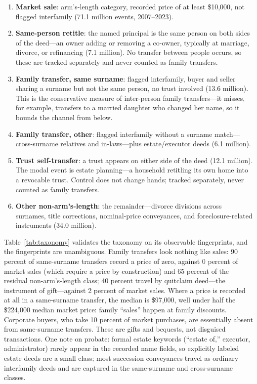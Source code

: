\documentclass[12pt, letterpaper]{article}
\begin{document}
\begin{enumerate}
  \item \textbf{Market sale}: arm's-length category, recorded price of at
        least \$10,000, not flagged interfamily (71.1 million events,
        2007--2023).
  \item \textbf{Same-person retitle}: the named principal is the same person
        on both sides of the deed---an owner adding or removing a co-owner,
        typically at marriage, divorce, or refinancing (7.1 million). No
        transfer between people occurs, so these are tracked separately and
        never counted as family transfers.
  \item \textbf{Family transfer, same surname}: flagged interfamily, buyer
        and seller sharing a surname but not the same person, no trust
        involved (13.6 million). This is the conservative measure of
        inter-person family transfers---it misses, for example, transfers to
        a married daughter who changed her name, so it bounds the channel
        from below.
  \item \textbf{Family transfer, other}: flagged interfamily without a
        surname match---cross-surname relatives and in-laws---plus
        estate/executor deeds (6.1 million).
  \item \textbf{Trust self-transfer}: a trust appears on either side of the
        deed (12.1 million). The modal event is estate planning---a household
        retitling its own home into a revocable trust. Control does not
        change hands; tracked separately, never counted as family transfers.
  \item \textbf{Other non-arm's-length}: the remainder---divorce divisions
        across surnames, title corrections, nominal-price conveyances, and
        foreclosure-related instruments (34.0 million).
\end{enumerate}

Table~\ref{tab:taxonomy} validates the taxonomy on its observable
fingerprints, and the fingerprints are unambiguous. Family transfers look
nothing like sales: 90 percent of same-surname transfers record a price of
zero, against 0 percent of market sales (which require a price by
construction) and 65 percent of the residual non-arm's-length class; 40
percent travel by quitclaim deed---the instrument of gift---against 2 percent
of market sales. Where a price is recorded at all in a same-surname transfer,
the median is \$97,000, well under half the \$224,000 median market price:
family ``sales'' happen at family discounts. Corporate buyers, who take 10
percent of market purchases, are essentially absent from same-surname
transfers. These are gifts and bequests, not disguised transactions. One
note on probate: formal estate keywords (``estate of,'' executor,
administrator) rarely appear in the recorded name fields, so explicitly
labeled estate deeds are a small class; most succession conveyances travel as
ordinary interfamily deeds and are captured in the same-surname and
cross-surname classes.
\end{document}
